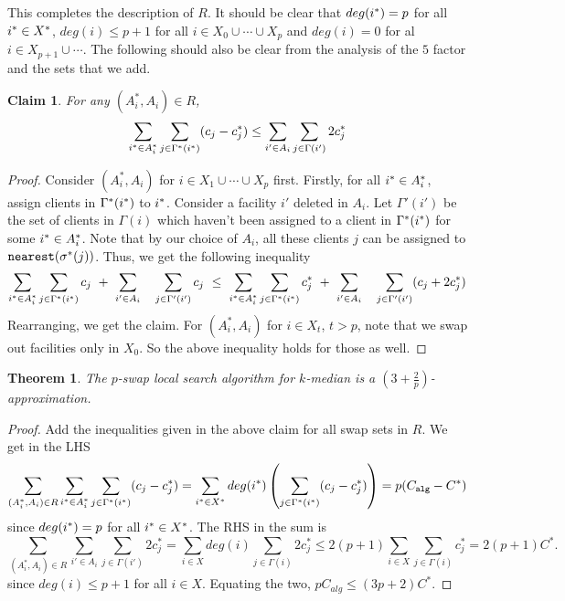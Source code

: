 \documentclass[11pt]{article}
\newtheorem{theorem}{Theorem}
\newtheorem{claim}{Claim}
\def\alg{{\tt alg}}
\begin{document}
This completes the description of $R$. It should be clear that $deg(i^*) = p$ for all $i^*\in X^*$, $deg(i) \le p+1$ for all $i\in X_0\cup \cdots \cup X_p$ and $deg(i)= 0$ for al $i\in X_{p+1} \cup \cdots$. The following should also be clear from the analysis of the $5$ factor and the sets that we add.

\begin{claim}
For any $(A^*_i,A_i)\in R$, 
$$\sum_{i^*\in A^*_i} \sum_{j\in \Gamma^*(i^*)} (c_j - c^*_j) \le \sum_{i'\in A_i}\sum_{j\in \Gamma(i')} 2c^*_j$$
\end{claim}
\begin{proof}
Consider $(A^*_i,A_i)$ for $i\in X_1\cup\cdots\cup X_p$ first. 
Firstly, for all $i^*\in A^*_i$, assign clients in $\Gamma^*(i^*)$ to $i^*$. Consider a facility $i'$ deleted in $A_i$.
Let $\Gamma'(i')$ be the set of clients in $\Gamma(i)$ which haven't been assigned to a client in 
$\Gamma^*(i^*)$ for some $i^*\in A^*_i$. Note that by our choice of $A_i$, all these clients $j$ can be 
assigned to ${\tt nearest}(\sigma^*(j))$. Thus, we get the following inequality
$$ 
\sum_{i^*\in A^*_i}\sum_{j\in \Gamma^*(i^*)} c_j ~ + ~ \sum_{i'\in A_i}~~~ \sum_{j\in \Gamma'(i')} c_j  ~ \le ~ \sum_{i^*\in A^*_i}\sum_{j\in \Gamma^*(i^*)} c^*_j ~+ ~ \sum_{i'\in A_i}~~~ \sum_{j\in \Gamma'(i')} (c_j + 2c^*_j) 
$$
Rearranging, we get the claim. For $(A^*_i,A_i)$ for $i\in X_t$, $t>p$, note that we swap out facilities
only in $X_0$. So the above inequality holds for those as well.
\end{proof}

\begin{theorem}
The $p$-swap local search algorithm for $k$-median is a $(3+\frac{2}{p})$-approximation.
\end{theorem}
\begin{proof}
Add the inequalities given in the above claim for all swap sets in $R$. We get in the LHS
$$ 
\sum_{(A^*_i,A_i)\in R}\sum_{\i\in A^*_i} \sum_{j\in \Gamma^*(\i)} (c_j - c^*_j) = 
\sum_{\i\in X^*}deg(\i)\left(\sum_{j\in \Gamma^*(\i)} (c_j - c^*_j) \right) = p(C_{\alg} - C^*)
$$
since $deg(i^*) = p$ for all $i^*\in X^*$. The RHS in the sum is 
$$
\sum_{(A^*_i,A_i)\in R} \sum_{i'\in A_i}\sum_{j\in \Gamma(i')} 2c^*_j = \sum_{i\in X}deg(i)\sum_{j\in \Gamma(i)} 2c^*_j \le 2(p+1)\sum_{i\in X}\sum_{j\in \Gamma(i)} c^*_j = 2(p+1)C^*.
$$
since $deg(i)\le p+1$ for all $i\in X$. Equating the two, 
$pC_{alg} \le (3p + 2)C^*$.
\end{proof}
\end{document}
